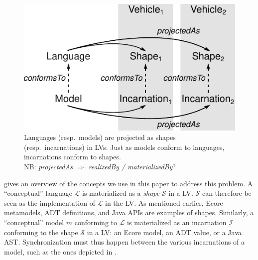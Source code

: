 \begin{figure}[bt]
	\centering
	\includegraphics[width=.8\columnwidth]{figures/concepts}
	\caption{Languages (resp.~models) are projected as shapes (resp.~incarnations) in LVs. Just as models conform to languages, incarnations conform to shapes.\\NB: \emph{projectedAs $\Rightarrow$ realizedBy / materializedBy}?}
	\label{fig:concepts}
\end{figure}

 gives an overview of the concepts we use in this paper to address this problem.
A ``conceptual'' language $\mathcal{L}$ is materialized as a \emph{shape} $\mathcal{S}$ in a LV.
$\mathcal{S}$ can therefore be seen as the implementation of $\mathcal{L}$ in the LV.
As mentioned earlier, Ecore metamodels, ADT definitions, and Java APIs are examples of shapes.
Similarly, a ``conceptual'' model $m$ conforming to $\mathcal{L}$ is materialized as an incarnation $\mathcal{I}$ conforming to the shape $\mathcal{S}$ in a LV: an Ecore model, an ADT value, or a Java AST.
Synchronization must thus happen between the various incarnations of a model, such as the ones depicted in .


